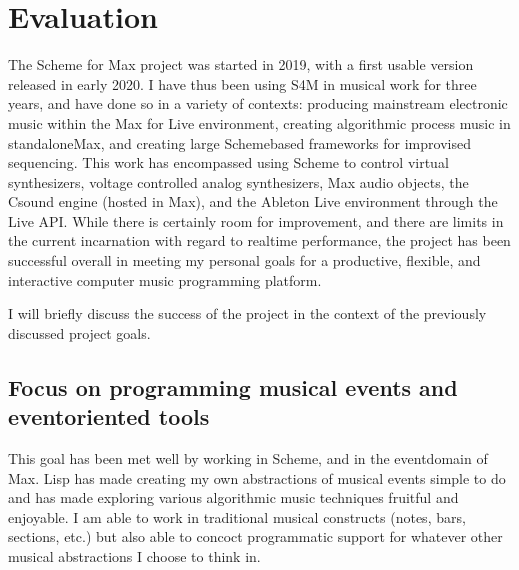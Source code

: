 \documentclass[letterpaper,10pt,english]{sphinxmanual}
\begin{document}
\section{Evaluation}
\label{\detokenize{conclusion:evaluation}}
\sphinxAtStartPar
The Scheme for Max project was started in 2019, with a first usable version released in early 2020.
I have thus been using S4M in musical work for three years, and have done so
in a variety of contexts: producing mainstream electronic music within the Max for Live
environment, creating algorithmic process music in standalone\sphinxhyphen{}Max,
and creating large Scheme\sphinxhyphen{}based frameworks for improvised sequencing.
This work has encompassed
using Scheme to control virtual synthesizers, voltage controlled analog
synthesizers, Max audio objects, the Csound engine (hosted in Max), and the
Ableton Live environment through the Live API.
While there is certainly room for improvement, and there are limits in the current
incarnation with regard to realtime performance, the project has been successful overall
in meeting my personal goals for a productive, flexible, and interactive computer
music programming platform.

\sphinxAtStartPar
I will briefly discuss the success of the project in the context of the previously discussed
project goals.


\subsection{Focus on programming musical events and event\sphinxhyphen{}oriented tools}
\label{\detokenize{conclusion:focus-on-programming-musical-events-and-event-oriented-tools}}
\sphinxAtStartPar
This goal has been met well by working in Scheme, and in the event\sphinxhyphen{}domain of Max.
Lisp has made creating my own abstractions of musical events simple to do and has made
exploring various algorithmic music techniques fruitful and enjoyable.
I am able to work in traditional musical constructs (notes, bars, sections, etc.)
but also able to concoct programmatic support for whatever other musical abstractions I choose to think in.
\end{document}
